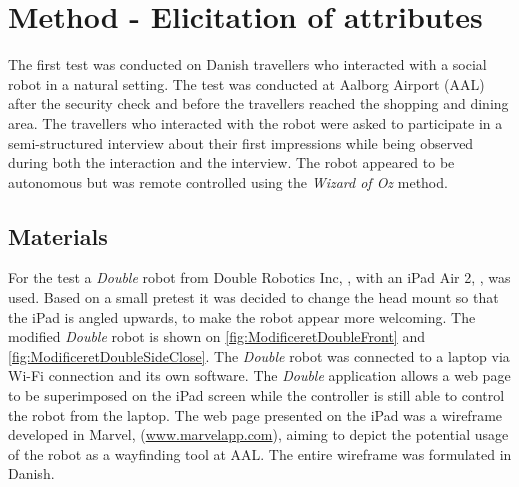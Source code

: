 \section{Method - Elicitation of attributes}
\label{MethodElicitation}
%
The first test was conducted on Danish travellers who interacted with a social robot in a natural setting. The test was conducted at Aalborg Airport (AAL) after the security check and before the travellers reached the shopping and dining area. The travellers who interacted with the robot were asked to participate in a semi-structured interview about their first impressions while being observed during both the interaction and the interview. The robot appeared to be autonomous but was remote controlled using the \textit{Wizard of Oz} method.

\subsection{Materials}
For the test a \textit{Double} robot from Double Robotics Inc, \cite{WEB:Double}, with an iPad Air 2, \cite{WEB:iPadAir2}, was used. Based on a small pretest it was decided to change the head mount so that the iPad is angled upwards, to make the robot appear more welcoming. The modified \textit{Double} robot is shown on \autoref{fig:ModificeretDoubleFront} and \autoref{fig:ModificeretDoubleSideClose}. The \textit{Double} robot was connected to a laptop via Wi-Fi connection and its own software. The \textit{Double} application allows a web page to be superimposed on the iPad screen while the controller is still able to control the robot from the laptop. The web page presented on the iPad was a wireframe developed in Marvel, (\url{www.marvelapp.com}), aiming to depict the potential usage of the robot as a wayfinding tool at AAL. The entire wireframe was formulated in Danish.

